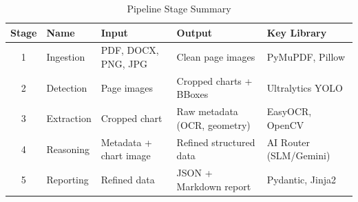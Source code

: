 \begin{table}[htbp]
\centering
\caption{Pipeline Stage Summary}
\label{tab:pipeline-stages}
\begin{tabular}{@{}clp{3cm}p{3cm}l@{}}
\toprule
\textbf{Stage} & \textbf{Name} & \textbf{Input} & \textbf{Output} & \textbf{Key Library} \\
\midrule
1 & Ingestion   & PDF, DOCX, PNG, JPG     & Clean page images        & PyMuPDF, Pillow \\
2 & Detection   & Page images             & Cropped charts + BBoxes  & Ultralytics YOLO \\
3 & Extraction  & Cropped chart           & Raw metadata (OCR, geometry) & EasyOCR, OpenCV \\
4 & Reasoning   & Metadata + chart image  & Refined structured data  & AI Router (SLM/Gemini) \\
5 & Reporting   & Refined data            & JSON + Markdown report   & Pydantic, Jinja2 \\
\bottomrule
\end{tabular}
\end{table}